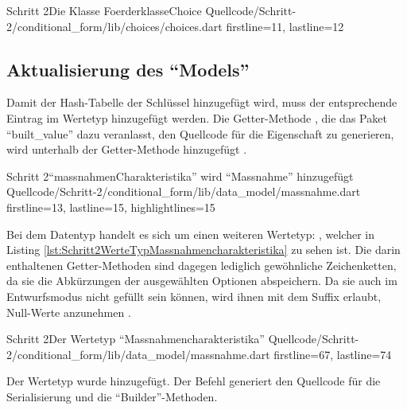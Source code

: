 \begin{alexlisting}{Schritt 2}{Die Klasse FoerderklasseChoice}
  {Quellcode/Schritt-2/conditional_form/lib/choices/choices.dart}
  {firstline=11, lastline=12}
  \label{lst:Schritt2KlasseFoerderklasseChoice}
\end{alexlisting}

\subsection{Aktualisierung des \enquote{Models}}

Damit der Hash-Tabelle der Schlüssel  hinzugefügt wird, muss der entsprechende Eintrag im Wertetyp  hinzugefügt werden.
Die Getter-Methode , die das Paket \enquote{built_value} dazu veranlasst, den Quellcode für die Eigenschaft zu generieren, wird unterhalb der Getter-Methode  hinzugefügt .

\begin{alexlisting}{Schritt 2}{\enquote{massnahmenCharakteristika} wird \enquote{Massnahme} hinzugefügt}
  {Quellcode/Schritt-2/conditional_form/lib/data_model/massnahme.dart}
  {firstline=13, lastline=15, highlightlines={15}}
  \label{lst:Schritt2massnahmenCharakteristikaWirdMMassnahmeHinzugefuegt}
\end{alexlisting}

Bei dem Datentyp handelt es sich um einen weiteren Wertetyp: , welcher in Listing \ref{lst:Schritt2WerteTypMassnahmencharakteristika} zu sehen ist.
Die darin enthaltenen Getter-Methoden sind dagegen lediglich gewöhnliche Zeichenketten, da sie die Abkürzungen der ausgewählten Optionen abspeichern.
Da sie auch im Entwurfsmodus nicht gefüllt sein können, wird ihnen mit dem Suffix  erlaubt, Null-Werte anzunehmen .

\begin{alexlisting}{Schritt 2}{Der Wertetyp \enquote{Massnahmencharakteristika}}
  {Quellcode/Schritt-2/conditional_form/lib/data_model/massnahme.dart}
  {firstline=67, lastline=74}
  \label{lst:Schritt2WerteTypMassnahmencharakteristika}
\end{alexlisting}

Der Wertetyp wurde hinzugefügt.
Der Befehl  generiert den Quellcode für die Serialisierung und die \enquote{Builder}-Methoden.

